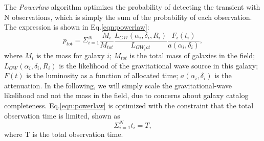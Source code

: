 \documentclass[twocolumn]{aastex61}
\begin{document}
The \emph{Powerlaw} algorithm optimizes the probability of detecting the transient with N observations, which is simply the sum of the probability of each observation. The expression is shown in Eq.\ref{eqn:powerlaw}:
\begin{equation}\label{eqn:powerlaw}
p_{tot}=\Sigma_{i=1}^N \frac{M_i}{M_{tot}}\frac{L_{GW}(\alpha_i, \delta_i, R_i)}{L_{GW_tot}}\frac{F_i(t_i)}{a(\alpha_i, \delta_i)},
\end{equation}
where $M_i$ is the mass for galaxy $i$; $M_{tot}$ is the total mass of galaxies in the field; $L_{GW}(\alpha_i, \delta_i, R_i)$ is the likelihood of the gravitational wave source in this galaxy; $F(t)$ is the luminosity as a function of allocated time; $a(\alpha_i, \delta_i)$ is the attenuation. In the following, we will simply scale the gravitational-wave likelihood and not the mass in the field, due to concerns about galaxy catalog completeness. Eq.\ref{eqn:powerlaw} is optimized with the constraint that the total observation time is limited, shown as
\begin{equation}
\Sigma_{i=1}^N t_i=T,
\end{equation}
where T is the total observation time.
\end{document}
